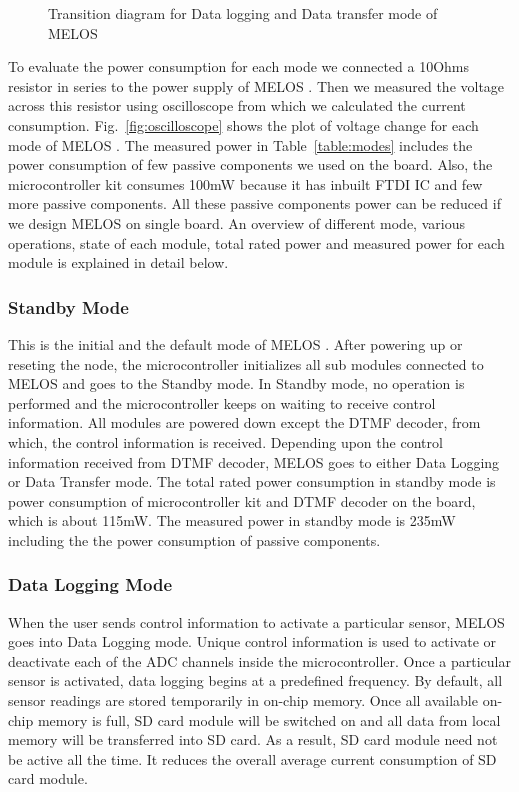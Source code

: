 \documentclass[10pt]{sigplan-proc-varsize}
\newcommand{\tabref}[1]{Table~\ref{#1}}
\newcommand{\figref}[1]{Fig.~\ref{#1}}
\newcommand{\melos}{MELOS }
\begin{document}
\begin{figure}
\centering
{}
\caption{Transition diagram for Data logging and Data transfer mode of \melos}
\label{fig:statetransition}
\end{figure}

{}
To evaluate the power consumption for each mode we connected a 10Ohms resistor in series to the power supply of \melos. Then we measured the voltage across this resistor using oscilloscope from which we calculated the current consumption. \figref{fig:oscilloscope} shows the plot of voltage change for each mode of \melos . The measured power in  \tabref{table:modes} includes the power consumption of few passive components we used on the board. Also, the microcontroller kit consumes 100mW because it has inbuilt FTDI IC and few more passive components. All these passive components power can be reduced if we design \melos on single board. An overview of different mode, various operations, state of each module, total rated power and measured power for each module is explained in detail below.  

\subsubsection{Standby Mode}
This is the initial and the default mode of \melos . After powering up or reseting the node, the microcontroller initializes all sub modules connected to \melos and goes to the Standby mode. In Standby mode, no operation is performed and the microcontroller keeps on waiting to receive control information. All modules are powered down except the DTMF decoder, from which, the control information is received. Depending upon the control information received from DTMF decoder, \melos goes to either Data Logging or Data Transfer mode. The total rated power consumption in standby mode is power consumption of microcontroller kit and DTMF decoder on the board, which is about 115mW. The measured power in standby mode is 235mW including the the power consumption of passive components.

\subsubsection{Data Logging Mode}
When the user sends control information to activate a particular sensor, \melos goes into Data Logging mode. Unique control information is used to activate or deactivate each of the ADC channels inside the microcontroller. Once a particular sensor is activated, data logging begins at a predefined frequency. By default, all sensor readings are stored temporarily in on-chip memory. Once all available on-chip memory is full, SD card module will be switched on and all data from local memory will be transferred into SD card. As a result, SD card module need not be active all the time. It reduces the overall average current consumption of SD card module.
\end{document}
